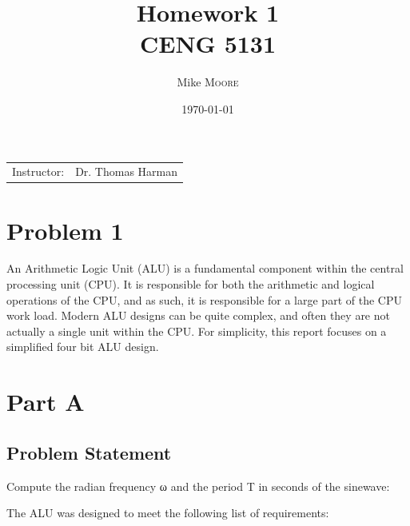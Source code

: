 \documentclass{article}
\title{Homework 1 \\ CENG 5131} %
\author{Mike \textsc{Moore}} %
\date{\today} %
\begin{document}
\maketitle %

\begin{center}
\begin{tabular}{l r}
Instructor: & Dr. Thomas Harman %
\end{tabular}
\end{center}




\newpage


\section{Problem 1}

An Arithmetic Logic Unit (ALU) is a fundamental component within the central processing
unit (CPU). It is responsible for both the arithmetic and logical operations of the CPU,
and as such, it is responsible for a large part of the CPU work load. Modern ALU designs
can be quite complex, and often they are not actually a single unit within the CPU. For 
simplicity, this report focuses on a simplified four bit ALU design.


\section{Part A}
\subsection{Problem Statement}
Compute the radian frequency ω and the period T in seconds of the
sinewave:




The ALU was designed to meet the following list of requirements:
\end{document}
